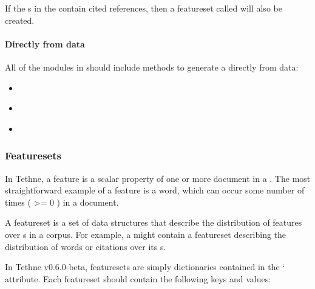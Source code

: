\documentclass[letterpaper,10pt,english]{sphinxmanual}
\begin{document}
If the {\hyperref[tethne.classes.paper:tethne.classes.paper.Paper]{}}s in the {\hyperref[tethne.classes.corpus:tethne.classes.corpus.Corpus]{}} contain cited references, then a
featureset called  will also be created.


\paragraph{Directly from data}
\label{corpora:directly-from-data}
All of the modules in {\hyperref[tethne.readers:module-tethne.readers]{}} should include methods to generate a
{\hyperref[tethne.classes.corpus:tethne.classes.corpus.Corpus]{}} directly from data:
\begin{itemize}
\item {} 
{\hyperref[tethne.readers.dfr:tethne.readers.dfr.read_corpus]{}}

\item {} 
{\hyperref[tethne.readers.scopus:tethne.readers.scopus.read_corpus]{}}

\item {} 
{\hyperref[tethne.readers.wos:tethne.readers.wos.read_corpus]{}}

\end{itemize}


\subsubsection{Featuresets}
\label{corpora:corpora-featuresets}\label{corpora:featuresets}
In Tethne, a feature is a scalar property of one or more document in a {\hyperref[tethne.classes.corpus:tethne.classes.corpus.Corpus]{}}.
The most straightforward example of a feature is a word, which can occur some number of
times ( \textgreater{}= 0 ) in a document.

A featureset is a set of data structures that describe the distribution of features
over {\hyperref[tethne.classes.paper:tethne.classes.paper.Paper]{}}s in a corpus. For example, a {\hyperref[tethne.classes.corpus:tethne.classes.corpus.Corpus]{}} might contain a
featureset describing the distribution of words or citations over its {\hyperref[tethne.classes.paper:tethne.classes.paper.Paper]{}}s.

In Tethne v0.6.0-beta, featuresets are simply dictionaries contained in the
{\hyperref[tethne.classes.corpus:tethne.classes.corpus.Corpus]{}}`  attribute. Each featureset should contain the following
keys and values:
\end{document}
